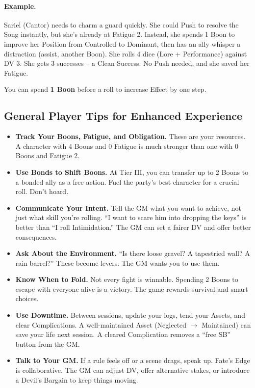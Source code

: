 \paragraph{Example.}
Sariel (Cantor) needs to charm a guard quickly. She could Push to resolve the Song instantly, but she's already at Fatigue 2. Instead, she spends 1 Boon to improve her Position from Controlled to Dominant, then has an ally whisper a distraction (assist, another Boon). She rolls 4 dice (Lore + Performance) against DV 3. She gets 3 successes -- a Clean Success. No Push needed, and she saved her Fatigue.

\begin{tcolorbox}[colback=blue!5!white,colframe=blue!75!black,title=Reminder,breakable]
You can spend \textbf{1 Boon} before a roll to increase Effect by one step.
\end{tcolorbox}

\subsection{General Player Tips for Enhanced Experience}

\begin{itemize}
  \item \textbf{Track Your Boons, Fatigue, and Obligation.} These are your resources. A character with 4 Boons and 0 Fatigue is much stronger than one with 0 Boons and Fatigue 2.
  \item \textbf{Use Bonds to Shift Boons.} At Tier III, you can transfer up to 2 Boons to a bonded ally as a free action. Fuel the party's best character for a crucial roll. Don't hoard.
  \item \textbf{Communicate Your Intent.} Tell the GM what you want to achieve, not just what skill you're rolling. ``I want to scare him into dropping the keys'' is better than ``I roll Intimidation.'' The GM can set a fairer DV and offer better consequences.
  \item \textbf{Ask About the Environment.} ``Is there loose gravel? A tapestried wall? A rain barrel?'' These become levers. The GM wants you to use them.
  \item \textbf{Know When to Fold.} Not every fight is winnable. Spending 2 Boons to escape with everyone alive is a victory. The game rewards survival and smart choices.
  \item \textbf{Use Downtime.} Between sessions, update your logs, tend your Assets, and clear Complications. A well-maintained Asset (Neglected $\rightarrow$ Maintained) can save your life next session. A cleared Complication removes a ``free SB'' button from the GM.
  \item \textbf{Talk to Your GM.} If a rule feels off or a scene drags, speak up. Fate's Edge is collaborative. The GM can adjust DV, offer alternative stakes, or introduce a Devil's Bargain to keep things moving.
\end{itemize}

